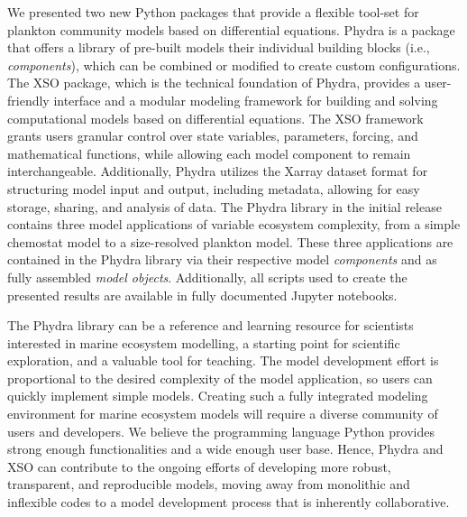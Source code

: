 \documentclass[journal abbreviation, manuscript]{copernicus}
\begin{document}
We presented two new Python packages that provide a flexible tool-set for plankton community models based on differential equations. Phydra is a package that offers a library of pre-built models their individual building blocks (i.e., \textit{components}), which can be combined or modified to create custom configurations. The XSO package, which is the technical foundation of Phydra, provides a user-friendly interface and a modular modeling framework for building and solving computational models based on differential equations. The XSO framework grants users granular control over state variables, parameters, forcing, and mathematical functions, while allowing each model component to remain interchangeable. Additionally, Phydra utilizes the Xarray dataset format for structuring model input and output, including metadata, allowing for easy storage, sharing, and analysis of data. The Phydra library in the initial release contains three model applications of variable ecosystem complexity, from a simple chemostat model to a size-resolved plankton model. These three applications are contained in the Phydra library via their respective model \textit{components} and as fully assembled \textit{model objects}. Additionally, all scripts used to create the presented results are available in fully documented Jupyter notebooks.

The Phydra library can be a reference and learning resource for scientists interested in marine ecosystem modelling, a starting point for scientific exploration, and a valuable tool for teaching. The model development effort is proportional to the desired complexity of the model application, so users can quickly implement simple models. Creating such a fully integrated modeling environment for marine ecosystem models will require a diverse community of users and developers. We believe the programming language Python provides strong enough functionalities and a wide enough user base. Hence, Phydra and XSO can contribute to the ongoing efforts of developing more robust, transparent, and reproducible models, moving away from monolithic and inflexible codes to a model development process that is inherently collaborative.







\end{document}
